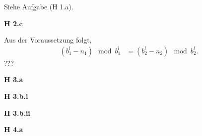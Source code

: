 \documentclass[12pt]{extarticle}
\begin{document}
Siehe Aufgabe (H 1.a).

\vspace{4mm}

\textbf{H 2.c}

\vspace{4mm}

Aus der Voraussetzung folgt,
\begin{align*}
  (b_1^l-n_1) \mod b_1^l&=(b_2^l-n_2) \mod b_2^l.
\end{align*}
???

\vspace{4mm}

\textbf{H 3.a}

\vspace{4mm}

\vspace{4mm}

\textbf{H 3.b.i}

\vspace{4mm}

\vspace{4mm}

\textbf{H 3.b.ii}

\vspace{4mm}

\vspace{4mm}

\newpage

\textbf{H 4.a}
\end{document}
